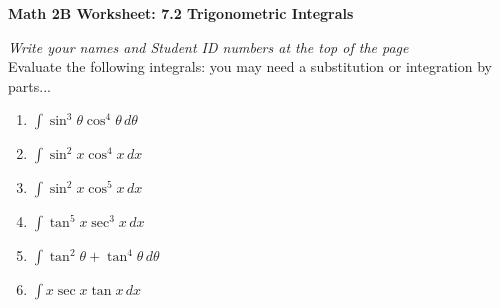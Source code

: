 \documentclass[12pt,fleqn]{article}
\begin{document}
\begin{center}
	\textbf{Math 2B Worksheet: 7.2 Trigonometric Integrals}
\end{center}

\emph{Write your names and Student ID numbers at the top of the page}\\

Evaluate the following integrals: you may need a substitution or integration by parts...
\begin{enumerate}
\item $\displaystyle \int\sin^3\theta\cos^4\theta\,d\theta$\vfill


\item $\displaystyle \int\sin^2 x\cos^4 x\,dx$\vfill

\item $\displaystyle \int\sin^2x\cos^5x\,dx$\vfill

\newpage


\item $\displaystyle \int\tan^5x\sec^3x\,dx$\vfill

\item $\displaystyle \int\tan^2\theta+\tan^4\theta\,d\theta$\vfill



\item $\displaystyle \int x\sec x\tan x\,dx$\vfill

\end{enumerate}
\end{document}
